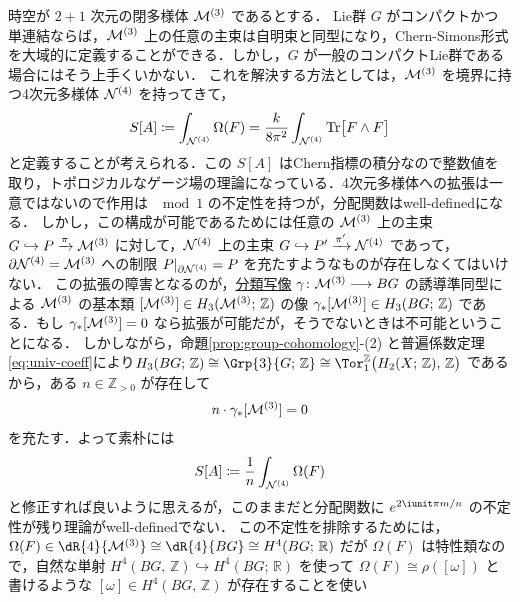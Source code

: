 \documentclass[TQFT_main]{subfiles}
\begin{document}
時空が $2+1$ 次元の閉多様体 $\mathcal{M}^{(3)}$ であるとする．
Lie群 $G$ がコンパクトかつ単連結ならば，$\mathcal{M}^{(3)}$ 上の任意の主束は自明束と同型になり，Chern-Simons形式を大域的に定義することができる．しかし，$G$ が一般のコンパクトLie群である場合にはそう上手くいかない．
これを解決する方法としては，$\mathcal{M}^{(3)}$ を境界に持つ4次元多様体 $\mathcal{N}^{(4)}$ を持ってきて，
\begin{align}
    S[A] \coloneqq \int_{\mathcal{N}^{(4)}} \Omega(F) = \frac{k}{8\pi^2} \int_{\mathcal{N}^{(4)}} \Tr \bigl[ F \wedge F \bigr] 
\end{align}
と定義することが考えられる．この $S[A]$ はChern指標の積分なので整数値を取り，トポロジカルなゲージ場の理論になっている．4次元多様体への拡張は一意ではないので作用は $\mod 1$ の不定性を持つが，分配関数はwell-definedになる．
しかし，この構成が可能であるためには任意の $\mathcal{M}^{(3)}$ 上の主束 $G \hookrightarrow P \xrightarrow{\pi} \mathcal{M}^{(3)}$ に対して，$\mathcal{N}^{(4)}$ 上の主束 $G \hookrightarrow P' \xrightarrow{\pi'} \mathcal{N}^{(4)}$ であって，$\partial \mathcal{N}^{(4)} = \mathcal{M}^{(3)}$ への制限 $P|_{\partial \mathcal{N}^{(4)}} = P$ を充たすようなものが存在しなくてはいけない．
この拡張の障害となるのが，\hyperref[prop:universal-basic]{分類写像} $\gamma \colon \mathcal{M}^{(3)} \longrightarrow BG$ の誘導準同型による $\mathcal{M}^{(3)}$ の基本類 $[\mathcal{M}^{(3)}] \in H_3(\mathcal{M}^{(3)};\, \mathbb{Z})$ の像 $\gamma_* [\mathcal{M}^{(3)}] \in H_3(BG;\, \mathbb{Z})$ である．もし $\gamma_* [\mathcal{M}^{(3)}] = 0$ なら拡張が可能だが，そうでないときは不可能ということになる．
しかしながら，命題\ref{prop:group-cohomology}-(2) と普遍係数定理\eqref{eq:univ-coeff}により$H_3 (BG;\, \mathbb{Z}) \cong \Grp{3}{G;\, \mathbb{Z}} \cong \Tor^{\mathbb{Z}}_1 \bigl( H_2(X;\, \mathbb{Z}),\, \mathbb{Z} \bigr)$ であるから，ある $n \in \mathbb{Z}_{> 0}$ が存在して
\begin{align}
    n \cdot \gamma_* [\mathcal{M}^{(3)}] = 0
\end{align}
を充たす．よって素朴には
\begin{align}
    S[A] \coloneqq \frac{1}{n} \int_{\mathcal{N}^{(4)}} \Omega(F)
\end{align}
と修正すれば良いように思えるが，このままだと分配関数に $e^{2\iunit \pi m/n}$ の不定性が残り理論がwell-definedでない．
この不定性を排除するためには，$\Omega(F) \in \dR{4}{\mfdcal{M}{3}} \cong \dR{4}{BG} \cong H^4(BG;\, \mathbb{R})$ だが $\Omega(F)$ は特性類なので，自然な単射 $H^4(BG,\, \mathbb{Z}) \hookrightarrow H^4(BG;\, \mathbb{R})$ を使って $\Omega(F) \cong \rho ([\omega])$ と書けるような $[\omega] \in H^4(BG,\, \mathbb{Z})$ が存在することを使い
\end{document}

